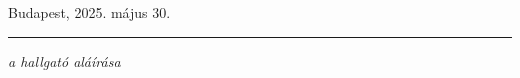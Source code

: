 \documentclass[UTF8,noindent,nohyp,parspace,titlepage,a4paper,12pt]{article}
\begin{document}
      \begin{minipage}[t]{0.5\linewidth}
        \begin{flushleft}
          Budapest, 2025. május 30.
        \end{flushleft}
      \end{minipage}
      \begin{minipage}[t]{0.5\linewidth}
        \begin{flushleft}
          \begin{center}
            \noindent\rule{\textwidth}{0.5pt}
            \emph{a hallgató aláírása}
          \end{center}
        \end{flushleft}
      \end{minipage}
\end{document}

